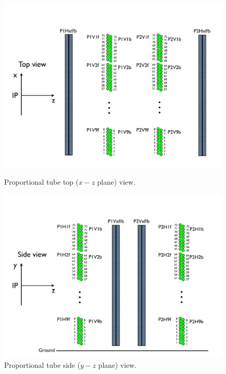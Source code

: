 \begin{figure}
	\centering
	\begin{minipage}[t]{0.49\linewidth}
		\includegraphics[width=\linewidth]{figures/apparatus/proptubeview_xz.pdf}
		\caption{Proportional tube top ($x-z$ plane) view.}
		\label{fig:proptube:xzview}
	\end{minipage}
	\begin{minipage}[t]{0.49\linewidth}
		\includegraphics[width=1.03\linewidth]{figures/apparatus/proptubeview_yz.pdf}
		\caption{Proportional tube side ($y-z$ plane) view.}
		\label{fig:proptube:yzview}
	\end{minipage}
\end{figure}


